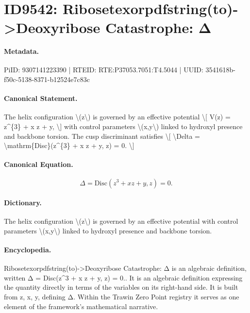 \section*{ID9542: Ribosetexorpdfstring(to)->Deoxyribose Catastrophe: Δ}
\paragraph{Metadata.}
PiID: 9307141223390 | RTEID: RTE:P37053.7051:T4.5044 | UUID: 3541618b-f50c-5138-8371-b12524e7c83c

\paragraph{Canonical Statement.}
The helix configuration \textbackslash{}(z\textbackslash{}) is governed by an effective potential \textbackslash{}[ V(z) = z\textasciicircum{}\{3\} + x z + y, \textbackslash{}] with control parameters \textbackslash{}(x,y\textbackslash{}) linked to hydroxyl presence and backbone torsion. The cusp discriminant satisfies \textbackslash{}[ \textbackslash{}Delta = \textbackslash{}mathrm\{Disc\}(z\textasciicircum{}\{3\} + x z + y, z) = 0. \textbackslash{}]

\paragraph{Canonical Equation.}
\[
\Delta = \mathrm{Disc}(z^{3} + x z + y, z) = 0.
\]

\paragraph{Dictionary.}
The helix configuration \textbackslash{}(z\textbackslash{}) is governed by an effective potential with control parameters \textbackslash{}(x,y\textbackslash{}) linked to hydroxyl presence and backbone torsion.

\paragraph{Encyclopedia.}
Ribosetexorpdfstring(to)->Deoxyribose Catastrophe: Δ is an algebraic definition, written Δ = Disc(z\textasciicircum{}3 + x z + y, z) = 0.. It is an algebraic definition expressing the quantity directly in terms of the variables on its right-hand side. It is built from z, x, y, defining Δ. Within the Trawin Zero Point registry it serves as one element of the framework's mathematical narrative.

